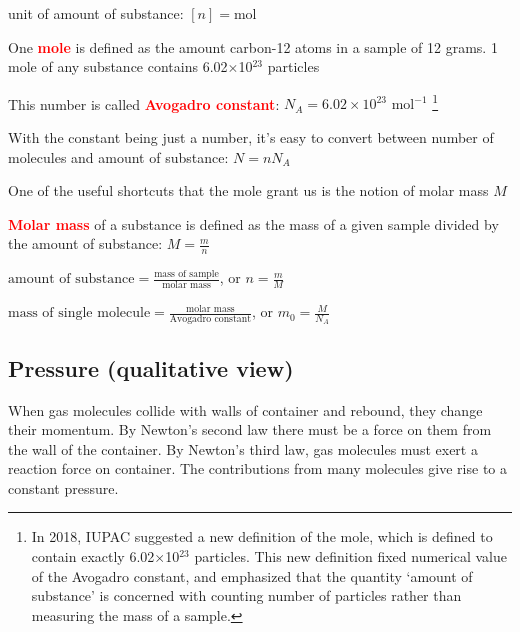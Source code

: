 \documentclass[a4paper,12pt]{book}
\newcommand{\cmt}{}
\newenvironment{ilight}
  {\centering
  	\vspace*{6pt}
  	\begin{tcolorbox}[colframe=Gray,colback=LightGrey!15]
  \setlength{\baselineskip}{\baselineskip}%
  }
  {\end{tcolorbox}\vspace*{-4pt}}
\newcommand{\keypoint}[1]{\textbf{\textcolor{red}{#1}}}
\newcommand{\eqyskip}{\vspace{4pt}}
\newcommand{\tcbhighmath}[1]{\boxed{#1}}
\newcommand{\keypoint}[1]{\textbf{\textcolor{red}{#1}}}
\newcommand{\cmt}{}
\begin{document}
\cmt unit of amount of substance: $[n] = \text{mol}$

\begin{ilight}
	One \keypoint{mole} is defined as the amount carbon-12 atoms in a sample of 12 grams. 1 mole of any substance contains 6.02$\times$10$^{23}$ particles
\end{ilight}

This number is called \keypoint{Avogadro constant}: $N_A = 6.02\times10^{23} \text{ mol}^{-1}$ \footnote{In 2018, IUPAC suggested a new definition of the mole, which is defined to contain exactly 6.02$\times$10$^{23}$ particles. This new definition fixed numerical value of the Avogadro constant, and emphasized that the quantity `amount of substance' is concerned with counting number of particles rather than measuring the mass of a sample.}

With the constant being just a number, it's easy to convert between number of molecules and amount of substance: $\tcbhighmath{N=nN_A}$

One of the useful shortcuts that the mole grant us is the notion of molar mass $M$

\begin{ilight}
	\keypoint{Molar mass} of a substance is defined as the mass of a given sample divided by the amount of substance: $M=\frac{m}{n}$
\end{ilight}

\begin{compactitem}
	\item[--] $\text{amount of substance} = \frac{\text{mass of sample}}{\text{molar mass}}$, or $n = \frac{m}{M}$
	
	\eqyskip
	
	\item[--] $\text{mass of single molecule} = \frac{\text{molar mass}}{\text{Avogadro constant}}$, or $m_0 = \frac{M}{N_A}$
\end{compactitem}

	

\subsection{Pressure (qualitative view)}

When gas molecules collide with walls of container and rebound, they change their momentum. By Newton's second law there must be a force on them from the wall of the container. By Newton's third law, gas molecules must exert a reaction force on container. The contributions from many molecules give rise to a constant pressure.
\end{document}
